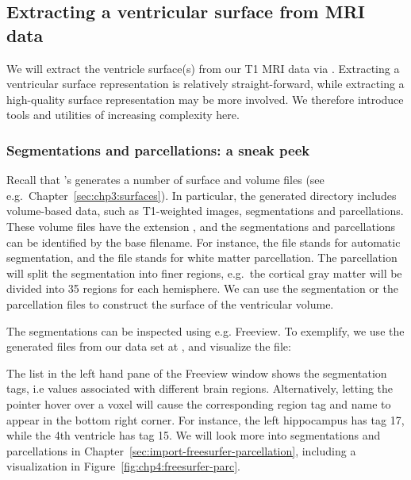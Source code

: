 \subsection{Extracting a ventricular surface from MRI data}
\label{sec:chp4:tools:remove-vent:extraction}  

We will extract the ventricle surface(s) from our T1 MRI data via
{\freesurfer}. Extracting a ventricular surface representation is
relatively straight-forward, while extracting a high-quality surface
representation may be more involved. We therefore introduce tools and
utilities of increasing complexity here.

\subsubsection*{Segmentations and parcellations: a sneak peek}
Recall that \freesurfer's  generates a number of
surface and volume files (see
e.g.~Chapter~\ref{sec:chp3:surfaces}). In particular, the
\freesurfer{} generated  directory includes volume-based
data, such as T1-weighted images, segmentations and
parcellations. These volume files have the extension , and
the segmentations and parcellations can be identified by the base
filename. For instance, the file  stands for automatic
segmentation, and the file  stands for white matter
parcellation. The parcellation will split the segmentation into finer
regions, e.g.~the cortical gray matter will be divided into 35 regions
for each hemisphere. We can use the segmentation or the parcellation
files to construct the surface of the ventricular volume. 

The segmentations can be inspected using e.g. Freeview. To
exemplify, we use the \freesurfer{} generated files from our data set
at , and visualize the 
file:

\noindent The list in the left hand pane of the Freeview window shows
the segmentation tags, i.e values associated with different brain
regions. Alternatively, letting the pointer hover over a voxel will
cause the corresponding region tag and name to appear in the bottom
right corner. For instance, the left hippocampus has tag 17, while the
4th ventricle has tag 15. We will look more into segmentations and
parcellations in Chapter~\ref{sec:import-freesurfer-parcellation},
including a visualization in Figure~\ref{fig:chp4:freesurfer-parc}.

